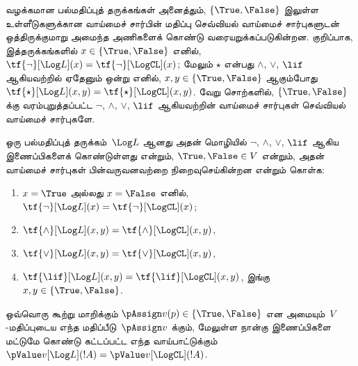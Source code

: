 \documentclass[../../../include/open-logic-section]{subfiles}
\begin{document}


வழக்கமான பல்மதிப்புத் தருக்கங்கள் அனைத்தும், $\{\True, \False\}$ இலுள்ள
உள்ளீடுகளுக்கான வாய்மைச் சார்பின் மதிப்பு செவ்வியல் வாய்மைச் சார்புகளுடன்
ஒத்திருக்குமாறு அமைந்த அணிகளைக் கொண்டு வரையறுக்கப்படுகின்றன. குறிப்பாக,
இத்தருக்கங்களில் $x \in \{\True, \False\}$ எனில்,
$\tf{\lnot}[\Log L](x) =
\tf{\lnot}[\LogCL](x)$; மேலும் $\star$ என்பது $\land$, $\lor$, $\lif$
ஆகியவற்றில் ஏதேனும் ஒன்று எனில், $x, y \in \{\True, \False\}$ ஆகும்போது
$\tf{\star}[\Log L](x,y) =
\tf{\star}[\LogCL](x,y)$. வேறு சொற்களில், $\{\True,\False\}$ க்கு
வரம்புறுத்தப்பட்ட $\lnot$, $\land$, $\lor$, $\lif$ ஆகியவற்றின் வாய்மைச்
சார்புகள் செவ்வியல் வாய்மைச் சார்புகளே.

\begin{prop}
  ஒரு பல்மதிப்புத் தருக்கம்~$\Log L$ ஆனது அதன் மொழியில்
  $\lnot$, $\land$, $\lor$, $\lif$ ஆகிய இணைப்பிகளைக் கொண்டுள்ளது என்றும்,
  $\True, \False \in V$ என்றும், அதன் வாய்மைச் சார்புகள் பின்வருவனவற்றை
  நிறைவுசெய்கின்றன என்றும் கொள்க:
  \begin{enumerate}
    \item{} $x = \True$ அல்லது $x = \False$ எனில்,
    $\tf{\lnot}[\Log L](x) = \tf{\lnot}[\LogCL](x)$;
    \item{} $\tf{\land}[\Log L](x,y) = \tf{\land}[\LogCL](x,y)$,
    \item{} $\tf{\lor}[\Log L](x,y) = \tf{\lor}[\LogCL](x,y)$,
    \item{} $\tf{\lif}[\Log L](x,y) = \tf{\lif}[\LogCL](x,y)$,
    இங்கு $x, y \in \{\True, \False\}$.
  \end{enumerate}
  ஒவ்வொரு கூற்று மாறிக்கும் $\pAssign v(p) \in \{\True,\False\}$ என
  அமையும்~$V$-மதிப்புடைய எந்த மதிப்பீடு~$\pAssign v$ க்கும்,
  மேலுள்ள நான்கு இணைப்பிகளை மட்டுமே கொண்டு கட்டப்பட்ட எந்த வாய்பாட்டுக்கும்
  $\pValue v[\Log L](!A) = \pValue v[\LogCL](!A)$.
\end{prop}
\end{document}
